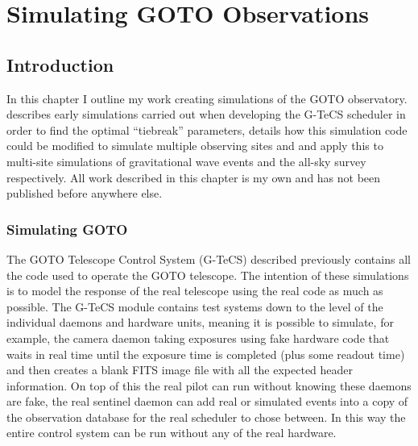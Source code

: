 \chapter{Simulating GOTO Observations}
\label{chap:sims}
\chaptoc{}


\newpage
\section{Introduction}
\label{sec:sims_intro}
\begin{colsection}


\begin{colsection}

In this chapter I outline my work creating simulations of the GOTO observatory.  describes early simulations carried out when developing the G-TeCS scheduler in order to find the optimal ``tiebreak'' parameters,  details how this simulation code could be modified to simulate multiple observing sites and  and  apply this to multi-site simulations of gravitational wave events and the all-sky survey respectively. All work described in this chapter is my own and has not been published before anywhere else.

\end{colsection}


\subsection{Simulating GOTO}
\label{sec:goto_sims}
\begin{colsection}

The GOTO Telescope Control System (G-TeCS) described previously contains all the code used to operate the GOTO telescope. The intention of these simulations is to model the response of the real telescope using the real code as much as possible. The G-TeCS module contains test systems down to the level of the individual daemons and hardware units, meaning it is possible to simulate, for example, the camera daemon taking exposures using fake hardware code that waits in real time until the exposure time is completed (plus some readout time) and then creates a blank FITS image file with all the expected header information. On top of this the real pilot can run without knowing these daemons are fake, the real sentinel daemon can add real or simulated events into a copy of the observation database for the real scheduler to chose between. In this way the entire control system can be run without any of the real hardware.


\end{colsection}
\end{colsection}

